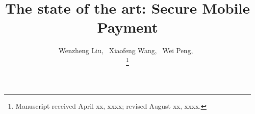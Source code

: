 \documentclass[journal]{IEEEtran}
\begin{document}
%
\title{The state of the art: Secure Mobile Payment
}
%
%
%

\author{Wenzheng Liu,~
        Xiaofeng Wang,~
        Wei Peng,~
        
\thanks{Manuscript received April xx, xxxx; revised August xx, xxxx.}}

% 
%
\end{document}
